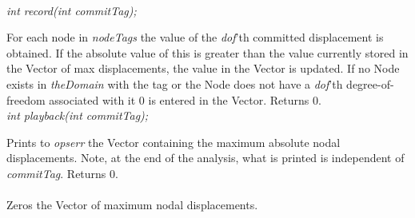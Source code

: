   \\
{\em int record(int commitTag);}

For each node in {\em nodeTags} the value of the {\em dof}'th committed
displacement is obtained. If the absolute value of this is greater
than the value currently stored in the Vector of max displacements,
the value in the Vector is updated. If no Node exists in {\em
theDomain} with the tag or the Node does not have a {\em dof}'th
degree-of-freedom associated with it $0$ is entered in the
Vector. Returns $0$. \\

{\em int playback(int commitTag);}

Prints to {\em opserr} the Vector containing the maximum absolute nodal
displacements. Note, at the end of the analysis, what is printed is
independent of {\em commitTag}. Returns $0$. \\

\\ 
Zeros the Vector of maximum nodal displacements.